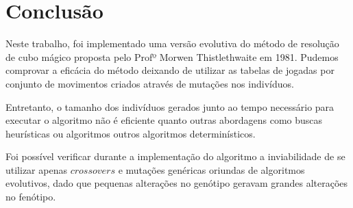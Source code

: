 \documentclass[12pt]{article}
\begin{document}
\section{Conclusão}
  Neste trabalho, foi implementado uma versão evolutiva do método de resolução de cubo mágico proposta pelo Profº Morwen Thistlethwaite em 1981. Pudemos comprovar a eficácia do método deixando de utilizar as tabelas de jogadas por conjunto de movimentos criados através de mutações nos indivíduos.

  Entretanto, o tamanho dos indivíduos gerados junto ao tempo necessário para executar o algoritmo não é eficiente quanto outras abordagens como buscas heurísticas ou algoritmos outros algoritmos determinísticos.

  Foi possível verificar durante a implementação do algoritmo a inviabilidade de se utilizar apenas $crossovers$ e mutações genéricas oriundas de algoritmos evolutivos, dado que pequenas alterações no genótipo geravam grandes alterações no fenótipo.



\end{document}

